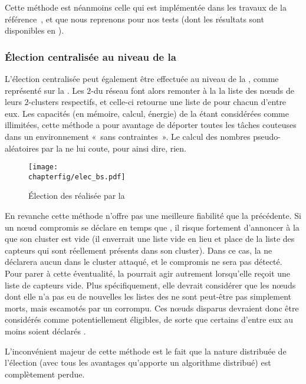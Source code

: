 Cette méthode est néanmoins celle qui est implémentée dans les travaux de la référence~\cite{GMT12}, et que nous reprenons pour nos tests (dont les résultats sont disponibles en ).

        \subsubsection{Élection centralisée au niveau de la \sdb}
L'élection centralisée peut également être effectuée au niveau de la \sdb, comme représenté sur la .
Les $2$-\CH du réseau font alors remonter à la \sdb la liste des nœuds de leurs $2$-clusters respectifs, et celle-ci retourne une liste de \cns pour chacun d'entre eux.
Les capacités (en mémoire, calcul, énergie) de la \sdb étant considérées comme illimitées, cette méthode a pour avantage de déporter toutes les tâches couteuses dans un environnement «~sans contraintes~».
Le calcul des nombres pseudo-aléatoires par la \sdb ne lui coute, pour ainsi dire, rien.
\begin{figure}[ht]
    \centering
    \texttt{[image: \\chapterfig/elec\_bs.pdf]}
    \caption{Élection des \cns réalisée par la \sdb}\label{sa:fig:elecbs}
\end{figure}

En revanche cette méthode n'offre pas une meilleure fiabilité que la précédente.
Si un nœud compromis se déclare en temps que \CH, il risque fortement d'annoncer à la \sdb que son cluster est vide (il enverrait une liste vide en lieu et place de la liste des capteurs qui sont réellement présents dans son cluster).
Dans ce cas, la \sdb ne déclarera aucun \cn dans le cluster attaqué, et le \CH compromis ne sera pas détecté.
Pour parer à cette éventualité, la \sdb pourrait agir autrement lorsqu'elle reçoit une liste de capteurs vide.
Plus spécifiquement, elle devrait considérer que les nœuds dont elle n'a pas eu de nouvelles \via les listes des \CH ne sont peut-être pas simplement morts, mais escamotés par un \ch corrompu.
Ces nœuds disparus devraient donc être considérés comme potentiellement éligibles, de sorte que certains d'entre eux au moins soient déclarés \cns.

L'inconvénient majeur de cette méthode est le fait que la nature distribuée de l'élection (avec tous les avantages qu'apporte un algorithme distribué) est complètement
perdue.

